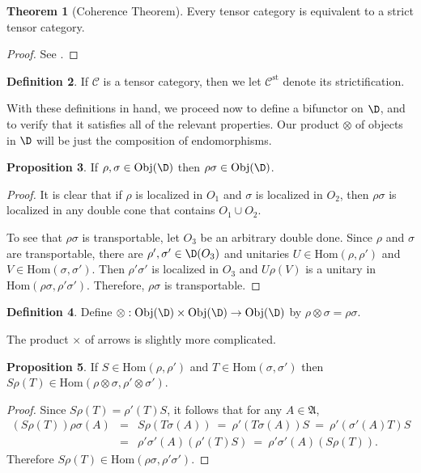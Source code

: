 \documentclass[11pt]{article}
\newcommand{\alg}[1]{\mathfrak{#1}}
\theoremstyle{definition}
\newtheorem{thm}{Theorem}[section]
\newtheorem{prop}[thm]{Proposition}
\theoremstyle{definition}
\newtheorem{defn}[thm]{Definition}
\theoremstyle{remark}
\newcommand{\Obj}{\mathrm{Obj}}
\def\2#1{{\mathcal #1}}
\newcommand{\Hom}{\mathrm{Hom}}
\begin{document}
\begin{thm}[Coherence Theorem] Every tensor category is
  equivalent to a strict tensor
  category. \label{coherence}
\end{thm}

\begin{proof} See \cite{cwm}. \end{proof}

\begin{defn} If $\2C$ is a tensor category, then we let
  $\2C ^{\mathrm{st}}$ denote its
  strictification. \end{defn}

With these definitions in hand, we proceed now to define a bifunctor on $\D$, and to
verify that it satisfies all of the relevant properties.  Our product $\otimes$ of
objects in $\D$ will be just the composition of endomorphisms.

\begin{prop} If $\rho ,\sigma \in \Obj (\D )$ then $\rho \sigma \in \Obj (\D )$.
\end{prop}

\begin{proof} It is clear that if $\rho$ is localized in $O_1$ and $\sigma$ is
  localized in $O_2$, then $\rho \sigma$ is localized in any double cone that
  contains $O_1\cup O_2$.  

  To see that $\rho \sigma$ is transportable, let $O_3$
  be an arbitrary double done.  Since $\rho$ and
  $\sigma$ are transportable, there are $\rho ',\sigma
  '\in \D (O_3)$ and unitaries $U\in \Hom (\rho ,\rho
  ')$ and $V\in \Hom (\sigma ,\sigma ')$.  Then $\rho
  '\sigma '$ is localized in $O_3$ and $U\rho (V)$ is a
  unitary in $\Hom (\rho \sigma ,\rho '\sigma ')$.
  Therefore, $\rho \sigma$ is transportable.
\end{proof}

\begin{defn} Define $\otimes :\Obj (\D )\times \Obj (\D )\to \Obj (\D )$ by $\rho
  \otimes \sigma =\rho \sigma$.  \end{defn}  

The product $\times$ of arrows is slightly more complicated.

\begin{prop} If $S\in \Hom (\rho ,\rho ')$ and $T\in \Hom (\sigma ,\sigma ')$ then
  $S\rho (T)\in \Hom (\rho \otimes \sigma ,\rho '\otimes \sigma ')$. \end{prop}

\begin{proof} Since $S\rho (T)=\rho '(T)S$, it follows that for any $A\in \alg{A}$,
  \begin{eqnarray*} (S\rho (T))\rho \sigma (A) &=& S\rho (T\sigma (A)) \:= \: \rho
    '(T\sigma (A))S \:=\: \rho '(\sigma '(A)T)S \\
    &=& \rho '\sigma '(A)(\rho '(T)S) \: =\: \rho '\sigma '(A)(S\rho (T)).
  \end{eqnarray*} Therefore $S\rho (T)\in \Hom (\rho \sigma ,\rho' \sigma ')$.
\end{proof}
\end{document}
